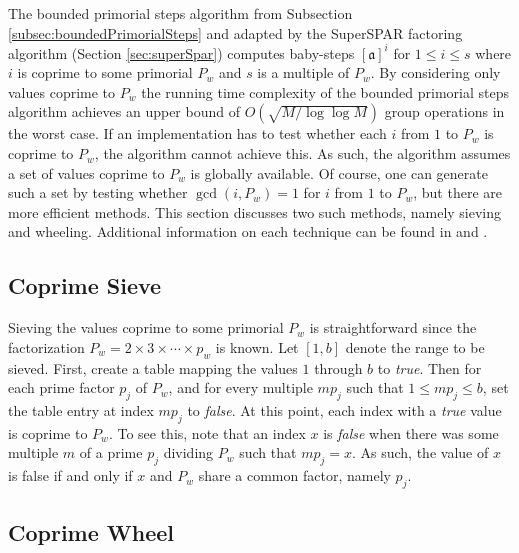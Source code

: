 \documentclass{ucalgthes1}
\theoremstyle{definition}
\newcommand{\set}{\mathcal}
\newcommand{\ideal}{\mathfrak}
\newcommand{\idealclass}[1]{\left[ \ideal #1 \right]}
\newcommand{\aclass}{\idealclass a}
\begin{document}
The bounded primorial steps algorithm from Subsection \ref{subsec:boundedPrimorialSteps} and adapted by the SuperSPAR factoring algorithm (Section \ref{sec:superSpar}) computes baby-steps $\aclass^i$ for $1 \le i \le s$ where $i$ is coprime to some primorial $P_w$ and $s$ is a multiple of $P_w$.  By considering only values coprime to $P_w$ the running time complexity of the bounded primorial steps algorithm achieves an upper bound of $O(\sqrt{M/\log \log M})$ group operations in the worst case.  If an implementation has to test whether each $i$ from $1$ to $P_w$ is coprime to $P_w$, the algorithm cannot achieve this.  As such, the algorithm assumes a set of values coprime to $P_w$ is globally available.  Of course, one can generate such a set by testing whether $\gcd(i, P_w) = 1$ for $i$ from $1$ to $P_w$, but there are more efficient methods.  This section discusses two such methods, namely sieving and wheeling.  Additional information on each technique can be found in \cite[pp.117--127]{Crandall2001} and \cite[p.494]{Sutherland2009}.

\subsection{Coprime Sieve}

Sieving the values coprime to some primorial $P_w$ is straightforward since the factorization $P_w = 2 \times 3 \times \cdots \times p_w$ is known.  Let $[1,b]$ denote the range to be sieved.  First, create a table mapping the values $1$ through $b$ to \emph{true}.  Then for each prime factor $p_j$ of $P_w$, and for every multiple $mp_j$ such that $1 \le mp_j \le b$, set the table entry at index $mp_j$ to \emph{false}.  At this point, each index with a \emph{true} value is coprime to $P_w$.  To see this, note that an index $x$ is \emph{false} when there was some multiple $m$ of a prime $p_j$ dividing $P_w$ such that $mp_j = x$.  As such, the value of $x$ is false if and only if $x$ and $P_w$ share a common factor, namely $p_j$.

\subsection{Coprime Wheel}
\label{subsec:coprimeWheel}
\newcommand{\coprimeset}{\set C}
\newcommand{\coprimelist}{\set D}
\end{document}
